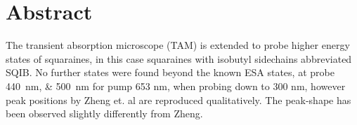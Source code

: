 \documentclass[twoside,openright,listof=numbered]{scrreprt}
\begin{document}
\nobibliography*







\printthesistitle


\chapter*{Abstract}
The transient absorption microscope (TAM) is extended to probe higher energy states of squaraines, in this case squaraines with isobutyl sidechains abbreviated SQIB. No further states were found beyond the known ESA states, at probe \SIlist{440;500}{\nano\meter} for  pump 653 nm, when probing down to 300 nm, however peak positions by Zheng et. al\cite{Zheng2020} are reproduced qualitatively. The peak-shape has been observed slightly differently from Zheng. 
\end{document}
